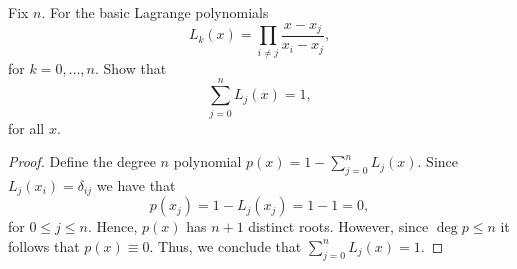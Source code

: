 \documentclass[8pt]{article}
\theoremstyle{definition}
\newenvironment{exercise}[1]
  {\renewcommand\theinnerexercise{#1}\innerexercise}
  {\endinnerexercise}
\begin{document}
\begin{exercise}{5}
Fix $n$. For the basic Lagrange polynomials $$L_k (x) = \prod_{i \neq j} \frac{x - x_j}{x_i - x_j},$$ for $k = 0, \ldots, n$. Show that $$\sum_{j = 0}^{n} L_{j} (x) = 1,$$ for all $x$.
\end{exercise}

\begin{proof}
Define the degree $n$ polynomial $p(x) = 1 - \sum_{j = 0}^{n} L_j (x)$. Since $L_j (x_i) = \delta_{ij}$ we have that $$p(x_j) = 1 - L_j (x_j) = 1 - 1 = 0,$$ for $0 \leq j \leq n$. Hence, $p(x)$ has $n + 1$ distinct roots. However, since $\deg p \leq n$ it follows that $p(x) \equiv 0$. Thus, we conclude that $\sum_{j = 0}^{n} L_j (x) = 1$. 
\end{proof}
\end{document}
